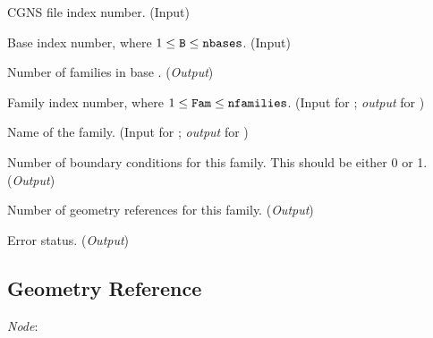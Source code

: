 \begin{Ventryi}{}\raggedright
\item [\fort{fn}]
      CGNS file index number.
      (\textcolor{input}{Input})
\item [\fort{B}]
      Base index number, where $1 \leq \text{{\normalfont\texttt{B}}} \leq \text{{\normalfont\texttt{nbases}}}$.
      (\textcolor{input}{Input})
\item [\fort{nfamilies}]
      Number of families in base .
      (\textcolor{output}{\textit{Output}})
\item [\fort{Fam}]
      Family index number, where $1 \leq \text{{\normalfont\texttt{Fam}}} \leq \text{{\normalfont\texttt{nfamilies}}}$.
      (\textcolor{input}{Input} for ;
      \textcolor{output}{\textit{output}} for )
\item [\fort{FamilyName}]
      Name of the family.
      (\textcolor{input}{Input} for ;
      \textcolor{output}{\textit{output}} for )
\item [\fort{nFamBC}]
      Number of boundary conditions for this family.
      This should be either 0 or 1.
      (\textcolor{output}{\textit{Output}})
\item [\fort{nGeo}]
      Number of geometry references for this family.
      (\textcolor{output}{\textit{Output}})
\item [\fort{ier}]
      Error status.
      (\textcolor{output}{\textit{Output}})
\end{Ventryi}

\newpage
\subsection{Geometry Reference}
\label{s:geometry}

\noindent
\textit{Node}: 

